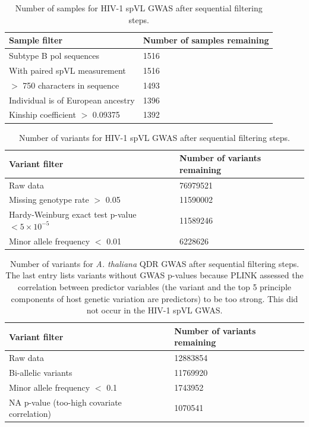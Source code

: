 \documentclass[11pt]{article}
\begin{document}
\begin{table}[H]
\caption{Number of samples for HIV-1 spVL GWAS after sequential filtering steps.}
    \begin{tabularx}{\linewidth}{XX}
    \hline
    Sample filter & Number of samples remaining \\
    \hline
    Subtype B pol sequences & 1516 \\
    With paired spVL measurement & 1516 \\
    $>$ 750 characters in sequence & 1493 \\
    Individual is of European ancestry & 1396 \\
    Kinship coefficient $>$ 0.09375 & 1392 \\ 
    \hline
    \end{tabularx}
    \label{tab:sample-filtering}
\end{table}

\begin{table}[H]
\caption{Number of variants for HIV-1 spVL GWAS after sequential filtering steps.}
	\begin{tabularx}{\linewidth}{XX}
	\hline
	Variant filter & Number of variants remaining \\
	\hline 
	Raw data & 76979521 \\
	Missing genotype rate $>$ 0.05 & 11590002 \\
	Hardy-Weinburg exact test p-value $< 5 \times 10^{-5}$ & 11589246 \\
	Minor allele frequency $<$ 0.01 & 6228626 \\ \hline			
	\end{tabularx}
	\label{tab:variant-filtering}
\end{table}

\begin{table}[H]
\caption{Number of variants for \emph{A. thaliana} QDR GWAS after sequential filtering steps. The last entry lists variants without GWAS p-values because PLINK assessed the correlation between predictor variables (the variant and the top 5 principle components of host genetic variation are predictors) to be too strong. This did not occur in the HIV-1 spVL GWAS.}
	\begin{tabularx}{\linewidth}{XX}
	\hline
	Variant filter & Number of variants remaining \\
	\hline 
	Raw data & 12883854 \\
	Bi-allelic variants & 11769920 \\
	Minor allele frequency $<$ 0.1 & 1743952 \\
	NA p-value (too-high covariate correlation) & 1070541 \\ \hline			
	\end{tabularx}
	\label{tab:variant-filtering-qdr}
\end{table}

\stopsection
\end{document}
